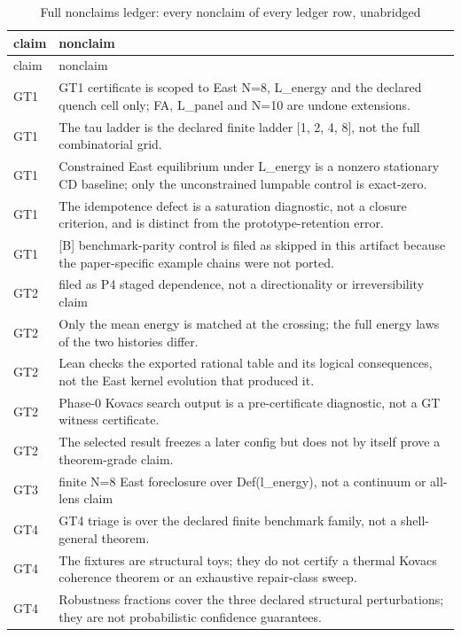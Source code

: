 \begin{longtable}{>{\raggedright\arraybackslash}p{3.6cm}p{11.6cm}}
\caption{Full nonclaims ledger: every nonclaim of every ledger row, unabridged}\label{tab:nonclaims-full} \\
\toprule
claim & nonclaim \\
\midrule
\endfirsthead
\toprule
claim & nonclaim \\
\midrule
\endhead
\bottomrule
\endfoot
GT1 & GT1 certificate is scoped to East N=8, L\_energy and the declared quench cell only; FA, L\_panel and N=10 are undone extensions. \\
GT1 & The tau ladder is the declared finite ladder [1, 2, 4, 8], not the full combinatorial grid. \\
GT1 & Constrained East equilibrium under L\_energy is a nonzero stationary CD baseline; only the unconstrained lumpable control is exact-zero. \\
GT1 & The idempotence defect is a saturation diagnostic, not a closure criterion, and is distinct from the prototype-retention error. \\
GT1 & [B] benchmark-parity control is filed as skipped in this artifact because the paper-specific example chains were not ported. \\
GT2 & filed as P4 staged dependence, not a directionality or irreversibility claim \\
GT2 & Only the mean energy is matched at the crossing; the full energy laws of the two histories differ. \\
GT2 & Lean checks the exported rational table and its logical consequences, not the East kernel evolution that produced it. \\
GT2 & Phase-0 Kovacs search output is a pre-certificate diagnostic, not a GT witness certificate. \\
GT2 & The selected result freezes a later config but does not by itself prove a theorem-grade claim. \\
GT3 & finite N=8 East foreclosure over Def(l\_energy), not a continuum or all-lens claim \\
GT4 & GT4 triage is over the declared finite benchmark family, not a shell-general theorem. \\
GT4 & The fixtures are structural toys; they do not certify a thermal Kovacs coherence theorem or an exhaustive repair-class sweep. \\
GT4 & Robustness fractions cover the three declared structural perturbations; they are not probabilistic confidence guarantees. \\

\end{longtable}
